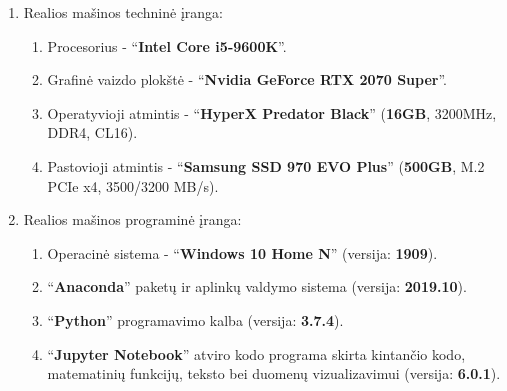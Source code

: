 \documentclass{VUMIFPSbakalaurinis}
\begin{document}
\begin{enumerate}
	\item Realios mašinos techninė įranga:
	\begin{enumerate}
		\item Procesorius - \enquote{\textbf{Intel Core i5-9600K}}.
		\item Grafinė vaizdo plokštė - \enquote{\textbf{Nvidia GeForce RTX 2070 Super}}.
		\item Operatyvioji atmintis - \enquote{\textbf{HyperX Predator Black}} (\textbf{16GB}, 3200MHz, DDR4, CL16).
		\item Pastovioji atmintis - \enquote{\textbf{Samsung SSD 970 EVO Plus}} (\textbf{500GB}, M.2 PCIe x4, 3500/3200 MB/s).
	\end{enumerate}

	\item Realios mašinos programinė įranga:
	\begin{enumerate}
		\item Operacinė sistema - \enquote{\textbf{Windows 10 Home N}} (versija: \textbf{1909}).
		\item \enquote{\textbf{Anaconda}} paketų ir aplinkų valdymo sistema (versija: \textbf{2019.10}).
		\item \enquote{\textbf{Python}} programavimo kalba (versija: \textbf{3.7.4}).
		\item \enquote{\textbf{Jupyter Notebook}} atviro kodo programa skirta kintančio kodo, matematinių funkcijų, teksto bei duomenų vizualizavimui (versija: \textbf{6.0.1}).
	\end{enumerate}
\end{enumerate}


\subsubsection{}

\printbibliography[heading=bibintoc] 
\end{document}
